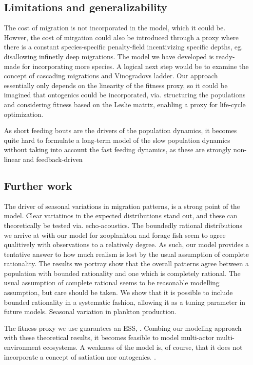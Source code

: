 \subsection{Limitations and generalizability} %
The cost of migration is not incorporated in the model, which it could be. Howver, the cost of mirgation could also be introduced through a proxy where there is a constant species-specific penalty-field incentivizing specific depths, eg. disallowing infinetly deep migrations.
The model we have developed is ready-made for incorporating more species. A logical next step would be to examine the concept of cascading migrations and Vinogradovs ladder. Our approach essentially only depends on the linearity of the fitness proxy, so it could be imagined that ontogenics could be incorporated, via. structuring the populations and considering fitness based on the Leslie matrix, enabling a proxy for life-cycle optimization.

As short feeding bouts are the drivers of the population dynamics, it becomes quite hard to formulate a long-term model of the slow population dynamics without taking into account the fast feeding dynamics, as these are strongly non-linear and feedback-driven


\subsection{Further work} %
The driver of seasonal variations in migration patterns, is a strong point of the model. Clear variatinos in the expected distributions stand out, and these can theoretically be tested via. echo-acoustics.
The boundedly rational distributions we arrive at with our model for zooplankton and forage fish seem to agree qualitively with observations to a relatively degree. As such, our model provides a tentative answer to how much realism is lost by the usual assumption of complete rationality. The results we portray show that the overall patterns agree between a population with bounded rationality and one which is completely rational. The usual assumption of complete rational seems to be reasonable modelling assumption, but care should be taken. We show that it is possible to include bounded rationality in a systematic fashion, allowing it as a tuning parameter in future models.
Seasonal variation in plankton production.


The fitness proxy we use guarantees an ESS, \citep{krivan}. Combing our modeling approach with these theoretical results, it becomes feasible to model multi-actor multi-environment ecosystems. A weakness of the model is, of course, that it does not incorporate a concept of satiation nor ontogenics. .


